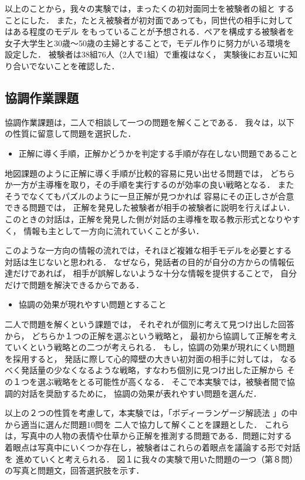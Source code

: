 以上のことから，我々の実験では，まったくの初対面同士を被験者の組と
することにした．
また，たとえ被験者が初対面であっても，同世代の相手に対してはある程度のモデル
をもっていることが予想される．ペアを構成する被験者を
女子大学生と30歳〜50歳の主婦とすることで，モデル作りに努力がいる環境を
設定した．
被験者は38組76人（2人で1組）で重複はなく，
実験後にお互いに知り合いでないことを確認した．

\subsection{協調作業課題}

協調作業課題は，二人で相談して一つの問題を解くことである．
我々は，以下の性質に留意して問題を選択した．

\begin{itemize}
\item 正解に導く手順，正解かどうかを判定する手順が存在しない問題であること
\end{itemize}

地図課題のように正解に導く手順が比較的容易に見い出せる問題では，
どちらか一方が主導権を取り，その手順を実行するのが効率の良い戦略となる．
またそうでなくてもパズルのように一旦正解が見つかれば
容易にその正しさが合意できる問題では，
正解を発見した被験者が相手の被験者に説明を行えばよい．
このときの対話は，正解を発見した側が対話の主導権を取る教示形式となりやすく，
情報も主として一方向に流れていくことが多い．

このような一方向の情報の流れでは，それほど複雑な相手モデルを必要とする
対話は生じないと思われる．
なぜなら，発話者の目的が自分の方からの情報伝達だけであれば，
相手が誤解しないような十分な情報を提供することで，
自分だけで問題を解決できるからである．

\begin{itemize}
\item 協調の効果が現れやすい問題とすること
\end{itemize}

二人で問題を解くという課題では，
それぞれが個別に考えて見つけ出した回答から，
どちらか１つの正解を選ぶという戦略と，
最初から協調して正解を考えていくという戦略との二つが考えられる．
もし，協調の効果が現れにくい問題を採用すると，
発話に際して心的障壁の大きい初対面の相手に対しては，
なるべく発話量の少なくなるような戦略，すなわち個別に見つけ出した正解から
その１つを選ぶ戦略をとる可能性が高くなる．
そこで本実験では，被験者間で協調的対話を奨励するために，
協調の効果が表れやすい問題を選んだ．

以上の２つの性質を考慮して，本実験では，「ボディーランゲージ解読法
\cite{Archer1980}」の中から適当に選んだ問題10問を
二人で協力して解くことを課題とした．
これらは，写真中の人物の表情や仕草から正解を推測する問題である．問題に対する
着眼点は写真中にいくつか存在し，被験者はこれらの着眼点を議論する形で対話を
進めていくと考えられる．
図１に我々の実験で用いた問題の一つ（第８問）の写真と問題文，回答選択肢を示す．


